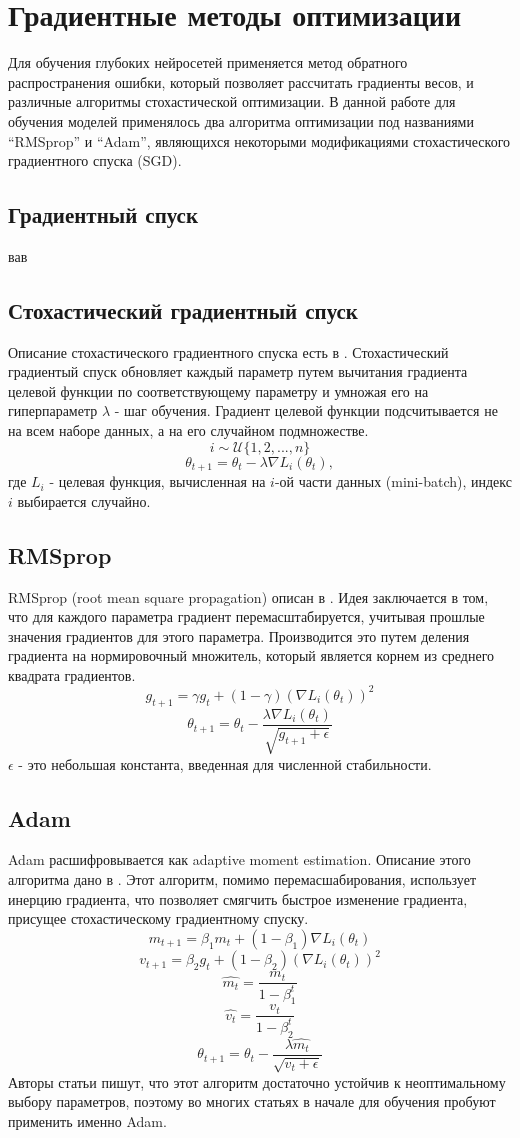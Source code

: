 \clearpage
\section{Градиентные методы оптимизации}
	Для обучения глубоких нейросетей применяется метод обратного распространения ошибки, который позволяет рассчитать градиенты весов, и различные алгоритмы стохастической оптимизации. В данной работе для обучения моделей применялось два алгоритма оптимизации под названиями ``RMSprop'' и ``Adam'', являющихся некоторыми модификациями стохастического градиентного спуска (SGD).
	\subsection{Градиентный спуск}
		вав
	\subsection{Стохастический градиентный спуск}
		Описание стохастического градиентного спуска есть в \cite{sgd}. Стохастический градиентый спуск обновляет каждый параметр путем вычитания градиента целевой функции по соответствующему параметру и умножая его на гиперпараметр $\lambda$ - шаг обучения. Градиент целевой функции подсчитывается не на всем наборе данных, а на его случайном подмножестве.
		$$ i \sim \mathcal{U}\{1, 2, ..., n\} $$
		$$ \theta_{t+1} = \theta_t - \lambda \nabla L_i(\theta_t), $$
		где $L_i$ - целевая функция, вычисленная на $i$-ой части данных (mini-batch), индекс $i$ выбирается случайно.
	\subsection{RMSprop}
		RMSprop (root mean square propagation) описан в \cite{rmsprop}. Идея заключается в том, что для каждого параметра градиент перемасштабируется, учитывая прошлые значения градиентов для этого параметра. Производится это путем деления градиента на нормировочный множитель, который является корнем из среднего квадрата градиентов.
		$$ g_{t+1} = \gamma g_t + (1 - \gamma) (\nabla L_i(\theta_t))^2$$
		$$ \theta_{t+1} = \theta_t - \frac{\lambda \nabla L_i(\theta_t)}{\sqrt{g_{t+1} + \epsilon}} $$
		$\epsilon$ - это небольшая константа, введенная для численной стабильности.
	\subsection{Adam}
		Adam расшифровывается как adaptive moment estimation. Описание этого алгоритма дано в \cite{adam}. Этот алгоритм, помимо перемасшабирования, использует инерцию градиента, что позволяет смягчить быстрое изменение градиента, присущее стохастическому градиентному спуску.
		$$ m_{t+1} = \beta_1 m_t + (1 - \beta_1) \nabla L_i(\theta_t) $$
		$$ v_{t+1} = \beta_2 g_t + (1 - \beta_2) (\nabla L_i(\theta_t))^2 $$
		$$ \hat{m_t} = \frac{m_t}{1 - \beta_1^t} $$
		$$ \hat{v_t} = \frac{v_t}{1 - \beta_2^t}$$
		$$ \theta_{t+1} = \theta_t - \frac{\lambda \hat{m_t}}{\sqrt{v_t + \epsilon}} $$
		Авторы статьи \cite{adam} пишут, что этот алгоритм достаточно устойчив к неоптимальному выбору параметров, поэтому во многих статьях в начале для обучения пробуют применить именно Adam.